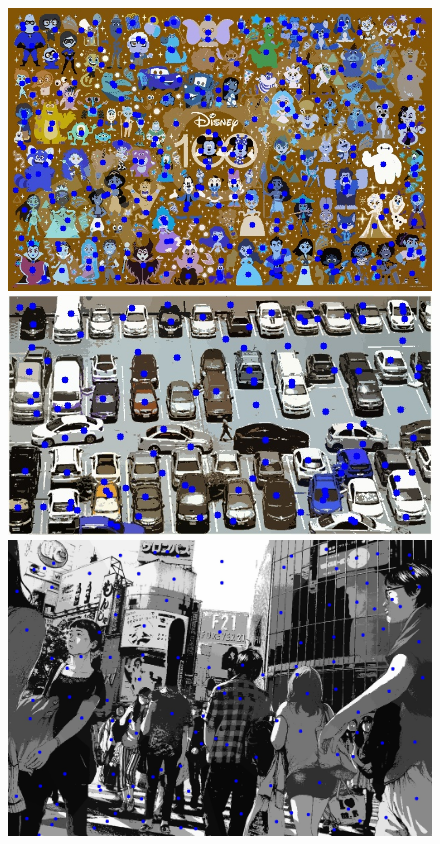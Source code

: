 \begin{figure}[H]
	\centering
	\begin{minipage}[b]{0.3\textwidth}
		\centering
		\includegraphics[width=\textwidth]{Graphics/disney-segmented.jpg}
	\end{minipage}
	\hfill
	\begin{minipage}[b]{0.3\textwidth}
		\centering
		\includegraphics[width=\textwidth]{Graphics/cars-segmented.jpg}
	\end{minipage}
	\hfill
	\begin{minipage}[b]{0.3\textwidth}
		\centering
		\includegraphics[width=\textwidth]{Graphics/japan-segmented.jpg}

\end{minipage}
\end{figure}
